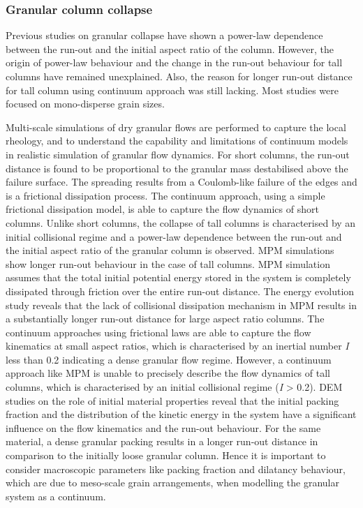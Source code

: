\subsubsection*{Granular column collapse}

Previous studies on granular collapse have shown a power-law dependence between 
the run-out and the initial aspect ratio of the column. However, the origin of 
power-law behaviour and the change in the run-out behaviour for tall columns 
have remained unexplained. Also, the reason for longer run-out distance for 
tall column using continuum approach was still lacking. Most studies
were focused on mono-disperse grain sizes. 

Multi-scale simulations of dry granular flows are performed to capture the 
local rheology, and to understand the capability and limitations of continuum 
models in realistic simulation of granular flow dynamics. For short columns, 
the run-out distance is found to be proportional to the granular mass 
destabilised above the failure surface. The spreading results from a 
Coulomb-like failure of the edges and is a frictional dissipation process. The 
continuum approach, using a simple frictional dissipation model, is able to 
capture the flow dynamics of short columns. Unlike short columns, the collapse 
of tall columns is characterised by an initial collisional regime and a 
power-law dependence between the run-out and the initial aspect ratio of the 
granular column is observed. MPM simulations show longer run-out behaviour in 
the case of tall columns. MPM simulation assumes that the total initial 
potential energy stored in the system is completely dissipated through friction 
over the entire run-out distance. The energy evolution study reveals that the 
lack of collisional dissipation mechanism in MPM results in a substantially 
longer run-out distance for large aspect ratio columns. The continuum 
approaches using frictional laws are able to capture the flow kinematics at 
small aspect ratios, which is characterised by an inertial 
number \textit{I} less than 0.2 indicating a dense granular flow regime. 
However, a continuum approach like MPM is unable to precisely describe the flow 
dynamics of tall columns, which is characterised by an initial collisional 
regime (\textit{I} > 0.2). DEM studies on the role of initial material 
properties reveal that the initial packing fraction and the distribution of the 
kinetic energy in the system have a significant influence on the flow 
kinematics and the run-out behaviour. For the same material, a dense granular 
packing results in a longer run-out distance in comparison to the initially 
loose granular column. Hence it is important to consider macroscopic parameters 
like packing fraction and dilatancy behaviour, which are due to meso-scale 
grain arrangements, when modelling the granular system as a continuum.

